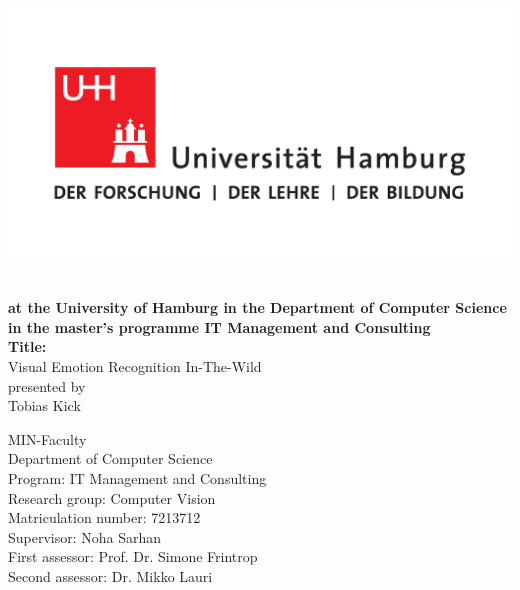 \documentclass[11pt,a4paper]{scrbook}
\begin{document}
\frontmatter  %
\begin{titlepage}
\includegraphics[scale=0.3]{UHH-Logo_2010_Farbe_CMYK.pdf}
\vspace*{2.0cm}
\Large
\begin{center}
{\color{uhhred}\textbf{}}
\vspace*{1.0cm}\\
{\textbf{at the University of Hamburg in the Department of Computer Science in the master's programme IT Management and Consulting}}
\vspace*{2.0cm}\\
{\LARGE \textbf{Title:}}
\vspace*{0.4cm}\\
{\LARGE Visual Emotion Recognition In-The-Wild}
\vspace*{1.5cm}\\
presented by
\vspace*{0.4cm}\\
Tobias Kick
\end{center}
\vspace*{2.0cm}

\noindent
MIN-Faculty \vspace*{0.25cm} \\
Department of Computer Science\vspace*{0.25cm} \\
Program: IT Management and Consulting\vspace*{0.25cm} \\
Research group: Computer Vision\vspace*{0.25cm} \\
Matriculation number: 7213712 \vspace*{0.5cm} \\
Supervisor: Noha Sarhan \vspace*{0.25cm} \\
First assessor: Prof. Dr. Simone Frintrop \vspace*{0.25cm} \\
Second assessor: Dr. Mikko Lauri


\end{titlepage}
\end{document}
